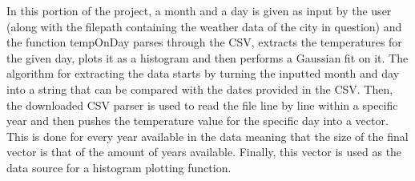 In this portion of the project, a month and a day is given as input by the user (along with the filepath containing the weather data of the city in question) and the function tempOnDay parses through the CSV, extracts the temperatures for the given day, plots it as a histogram and then performs a Gaussian fit on it. The algorithm for extracting the data starts by turning the inputted month and day into a string that can be compared with the dates provided in the CSV. Then, the downloaded CSV parser is used to read the file line by line within a specific year and then pushes the temperature value for the specific day into a vector. This is done for every year available in the data meaning that the size of the final vector is that of the amount of years available. Finally, this vector is used as the data source for a histogram plotting function.
